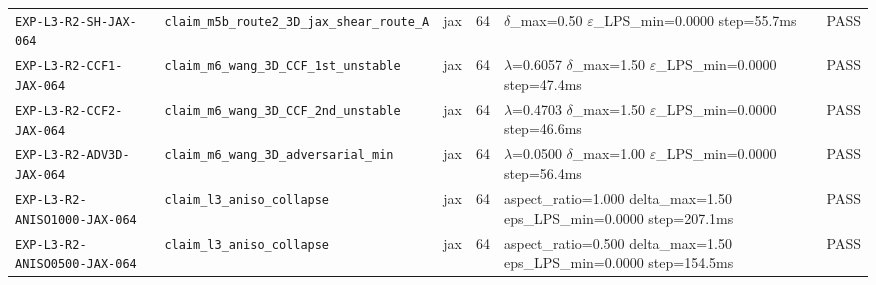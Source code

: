 {\begin{longtable}{@{}>{\raggedright\arraybackslash}p{} >{\raggedright\arraybackslash}p{} l l >{\raggedright\arraybackslash}p{} l@{}}
\texttt{EXP-\allowbreak{}L3-\allowbreak{}R2-\allowbreak{}SH-\allowbreak{}JAX-\allowbreak{}064} & \texttt{claim\_\allowbreak{}m5b\_\allowbreak{}route2\_\allowbreak{}3D\_\allowbreak{}jax\_\allowbreak{}shear\_\allowbreak{}route\_\allowbreak{}A} & jax & 64 & $\delta$\_\allowbreak{}max=\allowbreak{}0.50  $\varepsilon$\_\allowbreak{}LPS\_\allowbreak{}min=\allowbreak{}0.0000  step=\allowbreak{}55.7ms & \textsf{PASS}\\
\texttt{EXP-\allowbreak{}L3-\allowbreak{}R2-\allowbreak{}CCF1-\allowbreak{}JAX-\allowbreak{}064} & \texttt{claim\_\allowbreak{}m6\_\allowbreak{}wang\_\allowbreak{}3D\_\allowbreak{}CCF\_\allowbreak{}1st\_\allowbreak{}unstable} & jax & 64 & $\lambda$=\allowbreak{}0.6057  $\delta$\_\allowbreak{}max=\allowbreak{}1.50  $\varepsilon$\_\allowbreak{}LPS\_\allowbreak{}min=\allowbreak{}0.0000  step=\allowbreak{}47.4ms & \textsf{PASS}\\
\texttt{EXP-\allowbreak{}L3-\allowbreak{}R2-\allowbreak{}CCF2-\allowbreak{}JAX-\allowbreak{}064} & \texttt{claim\_\allowbreak{}m6\_\allowbreak{}wang\_\allowbreak{}3D\_\allowbreak{}CCF\_\allowbreak{}2nd\_\allowbreak{}unstable} & jax & 64 & $\lambda$=\allowbreak{}0.4703  $\delta$\_\allowbreak{}max=\allowbreak{}1.50  $\varepsilon$\_\allowbreak{}LPS\_\allowbreak{}min=\allowbreak{}0.0000  step=\allowbreak{}46.6ms & \textsf{PASS}\\
\texttt{EXP-\allowbreak{}L3-\allowbreak{}R2-\allowbreak{}ADV3D-\allowbreak{}JAX-\allowbreak{}064} & \texttt{claim\_\allowbreak{}m6\_\allowbreak{}wang\_\allowbreak{}3D\_\allowbreak{}adversarial\_\allowbreak{}min} & jax & 64 & $\lambda$=\allowbreak{}0.0500  $\delta$\_\allowbreak{}max=\allowbreak{}1.00  $\varepsilon$\_\allowbreak{}LPS\_\allowbreak{}min=\allowbreak{}0.0000  step=\allowbreak{}56.4ms & \textsf{PASS}\\
\texttt{EXP-\allowbreak{}L3-\allowbreak{}R2-\allowbreak{}ANISO1000-\allowbreak{}JAX-\allowbreak{}064} & \texttt{claim\_\allowbreak{}l3\_\allowbreak{}aniso\_\allowbreak{}collapse} & jax & 64 & aspect\_\allowbreak{}ratio=\allowbreak{}1.000  delta\_\allowbreak{}max=\allowbreak{}1.50  eps\_\allowbreak{}LPS\_\allowbreak{}min=\allowbreak{}0.0000  step=\allowbreak{}207.1ms & \textsf{PASS}\\
\texttt{EXP-\allowbreak{}L3-\allowbreak{}R2-\allowbreak{}ANISO0500-\allowbreak{}JAX-\allowbreak{}064} & \texttt{claim\_\allowbreak{}l3\_\allowbreak{}aniso\_\allowbreak{}collapse} & jax & 64 & aspect\_\allowbreak{}ratio=\allowbreak{}0.500  delta\_\allowbreak{}max=\allowbreak{}1.50  eps\_\allowbreak{}LPS\_\allowbreak{}min=\allowbreak{}0.0000  step=\allowbreak{}154.5ms & \textsf{PASS}\\

\end{longtable}}
